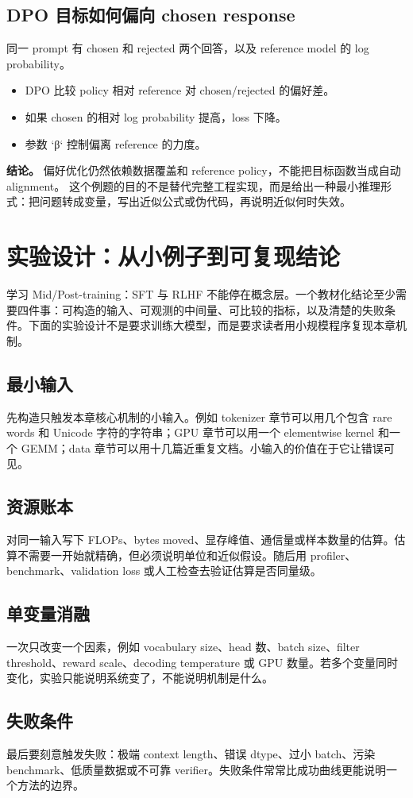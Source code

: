 \documentclass[a4paper]{article}
\begin{document}
\subsection{DPO 目标如何偏向 chosen response}
同一 prompt 有 chosen 和 rejected 两个回答，以及 reference model 的 log probability。
\begin{itemize}
\item DPO 比较 policy 相对 reference 对 chosen/rejected 的偏好差。
\item 如果 chosen 的相对 log probability 提高，loss 下降。
\item 参数 `β` 控制偏离 reference 的力度。
\end{itemize}
\textbf{结论。} 偏好优化仍然依赖数据覆盖和 reference policy，不能把目标函数当成自动 alignment。
这个例题的目的不是替代完整工程实现，而是给出一种最小推理形式：把问题转成变量，写出近似公式或伪代码，再说明近似何时失效。
\section{实验设计：从小例子到可复现结论}
学习 Mid/Post-training：SFT 与 RLHF 不能停在概念层。一个教材化结论至少需要四件事：可构造的输入、可观测的中间量、可比较的指标，以及清楚的失败条件。下面的实验设计不是要求训练大模型，而是要求读者用小规模程序复现本章机制。
\subsection{最小输入}
先构造只触发本章核心机制的小输入。例如 tokenizer 章节可以用几个包含 rare words 和 Unicode 字符的字符串；GPU 章节可以用一个 elementwise kernel 和一个 GEMM；data 章节可以用十几篇近重复文档。小输入的价值在于它让错误可见。
\subsection{资源账本}
对同一输入写下 FLOPs、bytes moved、显存峰值、通信量或样本数量的估算。估算不需要一开始就精确，但必须说明单位和近似假设。随后用 profiler、benchmark、validation loss 或人工检查去验证估算是否同量级。
\subsection{单变量消融}
一次只改变一个因素，例如 vocabulary size、head 数、batch size、filter threshold、reward scale、decoding temperature 或 GPU 数量。若多个变量同时变化，实验只能说明系统变了，不能说明机制是什么。
\subsection{失败条件}
最后要刻意触发失败：极端 context length、错误 dtype、过小 batch、污染 benchmark、低质量数据或不可靠 verifier。失败条件常常比成功曲线更能说明一个方法的边界。
\end{document}
